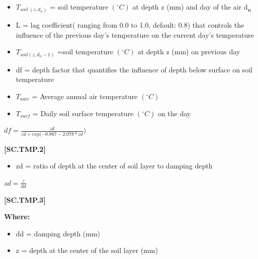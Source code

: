         \begin{itemize}
            \item \(T_{soil\ (z, d_n)}\) =	soil temperature \((^\circ C)\) at depth z (mm) and day of the air d\textsubscript{n}
            \item L	=	lag coefficient( ranging from 0.0 to 1.0, default: 0.8) that controls the influence of the previous day’s temperature on the current day’s temperature  

            \item \(T_{soil(z, d_n-1)}\) =soil temperature \((^\circ C)\) at depth z (mm) on previous day
            \item df	= depth factor that quantifies the influence of depth below surface on soil temperature
            \item \(T_{aair}\)	=	Average annual air temperature \((^\circ C)\)
            \item \(T_{surf}\)	=	Daily soil surface temperature \((^\circ C)\) on the day
        \end{itemize}
        \vspace{0.2cm}

    \begin{center}
\(df=\frac{zd}{zd+exp(-0.867-2.078 * zd})\)
    \end{center}
        \vspace{0.5cm} 
    
            {\raggedleft \textbf{[SC.TMP.2]}\par}
            \vspace{0.5cm}
        \begin{itemize}
            \item zd	=	ratio of depth at the center of soil layer to damping depth
        \end{itemize}
        \vspace{0.2cm}

    \begin{center}
\(zd= \frac{z}{dd}	\)
    \end{center}
        \vspace{0.5cm} 
    
            {\raggedleft \textbf{[SC.TMP.3]}\par}
            \vspace{0.5cm}

        \textbf{Where:}
        
        \begin{itemize}
            \item dd	=	damping depth (mm)
            \item z	=	depth at the center of the soil layer (mm)
        \end{itemize}

